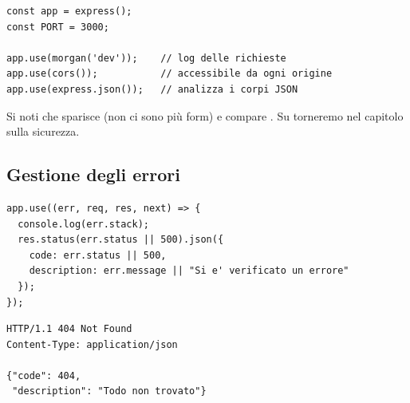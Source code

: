 \begin{affianco}[0.55][c]
\begin{lstlisting}[style=js, name=index.js]
const app = express();
const PORT = 3000;

app.use(morgan('dev'));    // log delle richieste
app.use(cors());           // accessibile da ogni origine
app.use(express.json());   // analizza i corpi JSON
\end{lstlisting}
\risultato
\begin{immagine}
\end{immagine}
\end{affianco}

Si noti che sparisce  (non ci sono più form) e compare
. Su  torneremo nel capitolo sulla sicurezza.

\subsection{Gestione degli errori}

\begin{affianco}[0.55][c]
\begin{lstlisting}[style=js, name=index.js]
app.use((err, req, res, next) => {
  console.log(err.stack);
  res.status(err.status || 500).json({
    code: err.status || 500,
    description: err.message || "Si e' verificato un errore"
  });
});
\end{lstlisting}
\risultato
\begin{lstlisting}[style=http, name=Risposta d'errore]
HTTP/1.1 404 Not Found
Content-Type: application/json

{"code": 404,
 "description": "Todo non trovato"}
\end{lstlisting}
\end{affianco}

